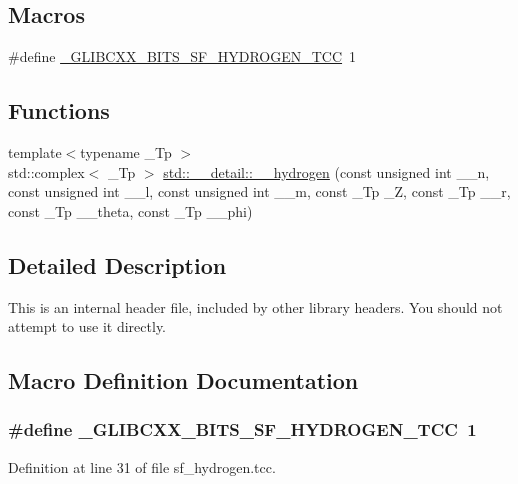 \subsection*{Macros}
\begin{DoxyCompactItemize}
\item 
\#define \hyperlink{sf__hydrogen_8tcc_af6b60d2402ae885b7f3ef4519fb65ed9}{\+\_\+\+G\+L\+I\+B\+C\+X\+X\+\_\+\+B\+I\+T\+S\+\_\+\+S\+F\+\_\+\+H\+Y\+D\+R\+O\+G\+E\+N\+\_\+\+T\+CC}~1
\end{DoxyCompactItemize}
\subsection*{Functions}
\begin{DoxyCompactItemize}
\item 
{\footnotesize template$<$typename \+\_\+\+Tp $>$ }\\std\+::complex$<$ \+\_\+\+Tp $>$ \hyperlink{namespacestd_1_1____detail_af8bd1ad6980e19dce3ee9eb518bc90fa}{std\+::\+\_\+\+\_\+detail\+::\+\_\+\+\_\+hydrogen} (const unsigned int \+\_\+\+\_\+n, const unsigned int \+\_\+\+\_\+l, const unsigned int \+\_\+\+\_\+m, const \+\_\+\+Tp \+\_\+Z, const \+\_\+\+Tp \+\_\+\+\_\+r, const \+\_\+\+Tp \+\_\+\+\_\+theta, const \+\_\+\+Tp \+\_\+\+\_\+phi)
\end{DoxyCompactItemize}


\subsection{Detailed Description}
This is an internal header file, included by other library headers. You should not attempt to use it directly. 

\subsection{Macro Definition Documentation}
\subsubsection[{\texorpdfstring{\+\_\+\+G\+L\+I\+B\+C\+X\+X\+\_\+\+B\+I\+T\+S\+\_\+\+S\+F\+\_\+\+H\+Y\+D\+R\+O\+G\+E\+N\+\_\+\+T\+CC}{_GLIBCXX_BITS_SF_HYDROGEN_TCC}}]{\setlength{\rightskip}{0pt plus 5cm}\#define \+\_\+\+G\+L\+I\+B\+C\+X\+X\+\_\+\+B\+I\+T\+S\+\_\+\+S\+F\+\_\+\+H\+Y\+D\+R\+O\+G\+E\+N\+\_\+\+T\+CC~1}\hypertarget{sf__hydrogen_8tcc_af6b60d2402ae885b7f3ef4519fb65ed9}{}\label{sf__hydrogen_8tcc_af6b60d2402ae885b7f3ef4519fb65ed9}


Definition at line 31 of file sf\+\_\+hydrogen.\+tcc.


